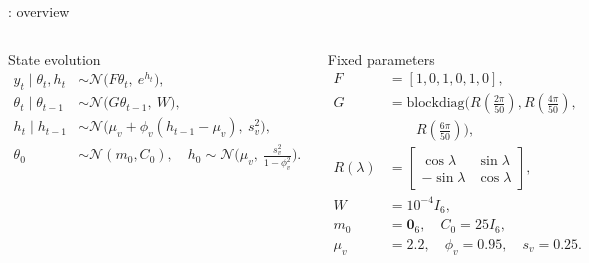 \begin{frame}{\casetitleprefix: overview}
\begin{columns}[T,onlytextwidth]
  \begin{whiteblock}{\small State evolution}
    \scriptsize
    \[
    \begin{aligned}
      y_t \mid \theta_t,h_t &\sim \mathcal{N}\!\big(F\theta_t,\ e^{h_t}\big),\\
      \theta_t \mid \theta_{t-1} &\sim \mathcal{N}\!\big(G\theta_{t-1},\ W\big),\\
      h_t \mid h_{t-1} &\sim \mathcal{N}\!\big(\mu_v + \phi_v(h_{t-1}-\mu_v),\ s_v^2\big),\\
      \theta_0 &\sim \mathcal{N}(m_0,C_0),\quad
      h_0 \sim \mathcal{N}\!\Big(\mu_v,\ \frac{s_v^2}{1-\phi_v^2}\Big).
    \end{aligned}
    \]
  \end{whiteblock}
  \begin{whiteblock}{\small Fixed parameters}
    \scriptsize
    \[
    \begin{aligned}
      F &= [1,0,1,0,1,0],\\
      G &= \mathrm{blockdiag}\!\big(R(\tfrac{2\pi}{50}),R(\tfrac{4\pi}{50}),\\
      &\qquad R(\tfrac{6\pi}{50})\big),\\
      R(\lambda) &= \begin{bmatrix}\cos\lambda&\sin\lambda\\ -\sin\lambda&\cos\lambda\end{bmatrix},\\
      W &= 10^{-4} I_6,\\
      m_0 &= \mathbf{0}_6,\quad C_0=25I_6,\\
      \mu_v &= 2.2,\quad \phi_v=0.95,\quad s_v=0.25.
    \end{aligned}
    \]
  \end{whiteblock}
\end{columns}
\end{frame}
